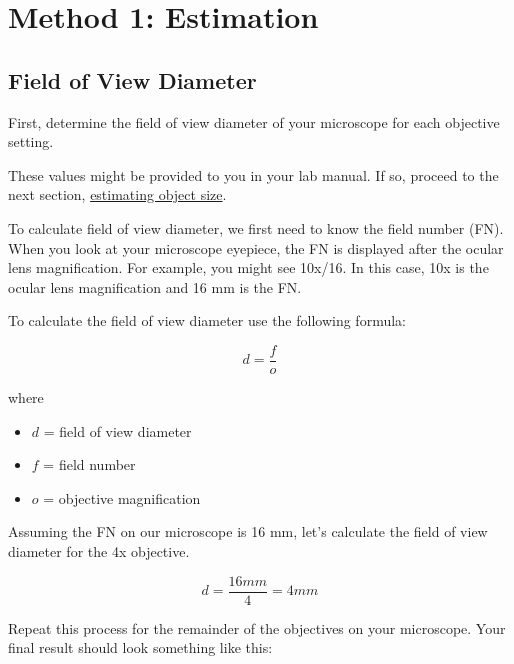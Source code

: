 \documentclass[
]{book}
\providecommand{\tightlist}{%
  \setlength{\itemsep}{0pt}\setlength{\parskip}{0pt}}
\begin{document}
\hypertarget{method-1-estimation}{%
\section{Method 1: Estimation}\label{method-1-estimation}}

\hypertarget{field-of-view-diameter}{%
\subsection*{Field of View Diameter}\label{field-of-view-diameter}}

First, determine the field of view diameter of your microscope for each objective setting.

These values might be provided to you in your lab manual. If so, proceed to the next section, \protect\hyperlink{estimating-object-size}{estimating object size}.

To calculate field of view diameter, we first need to know the field number (FN). When you look at your microscope eyepiece, the FN is displayed after the ocular lens magnification. For example, you might see 10x/16. In this case, 10x is the ocular lens magnification and 16 mm is the FN.

To calculate the field of view diameter use the following formula:

\[d = \frac{f}{o}\]

where

\begin{itemize}
\tightlist
\item
  \(d\) = field of view diameter
\item
  \(f\) = field number
\item
  \(o\) = objective magnification
\end{itemize}

Assuming the FN on our microscope is 16 mm, let's calculate the field of view diameter for the 4x objective.

\[d = \frac{16 mm}{4} = 4 mm\]

Repeat this process for the remainder of the objectives on your microscope. Your final result should look something like this:
\end{document}
